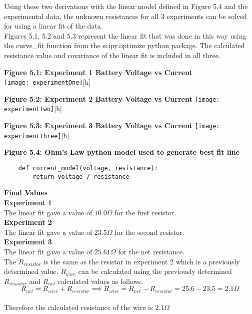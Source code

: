 \documentclass[
	letterpaper, %
	12pt, %
]{CSUniSchoolLabReport}
\begin{document}
Using these two derivations with the linear model defined in Figure 5.4 and the experimental data, the unknown resistances for all 3 experiments can be solved for using a linear fit of the data.\\
Figures 5.1, 5.2 and 5.3 represent the linear fit that was done in this way using the curve\_fit function from the scipy.optimize python package. The calculated resistance value and covariance of the linear fit is included in all three.\\

\begin{center}
    \textbf{Figure 5.1: Experiment 1 Battery Voltage vs Current}\\
    \texttt{[image: experimentOne]}[h]
\end{center}
\begin{center}
    \textbf{Figure 5.2: Experiment 2 Battery Voltage vs Current}
    \texttt{[image: experimentTwo]}[h]
\end{center}
\begin{center}
    \textbf{Figure 5.3: Experiment 3 Battery Voltage vs Current}
    \texttt{[image: experimentThree]}[h]
\end{center}

\begin{center}
    \textbf{Figure 5.4: Ohm's Law python model used to generate best fit line}
\end{center}
\begin{verbatim}
    def current_model(voltage, resistance):
        return voltage / resistance
\end{verbatim}
{\large\textbf{Final Values}}\\

\textbf{Experiment 1}\\
The linear fit gave a value of $10.0\Omega$ for the first resistor.\\

\textbf{Experiment 2}\\
The linear fit gave a value of $23.5\Omega$ for the second resistor.\\

\textbf{Experiment 3}\\
The linear fit gave a value of $25.61\Omega$ for the net resistance.\\
The $R_{resistor}$ is the same as the resistor in experiment 2 which is a previously determined value. $R_{wire}$ can be calculated using the previously determined $R_{resistor}$ and $R_{net}$ calculated values as follows.
$$R_{net} = R_{wire} + R_{resistor} \implies R_{wire} = R_{net} - R_{resistor} = 25.6 - 23.5 = 2.1\Omega$$\\
Therefore the calculated resistance of the wire is $2.1\Omega$
\end{document}
